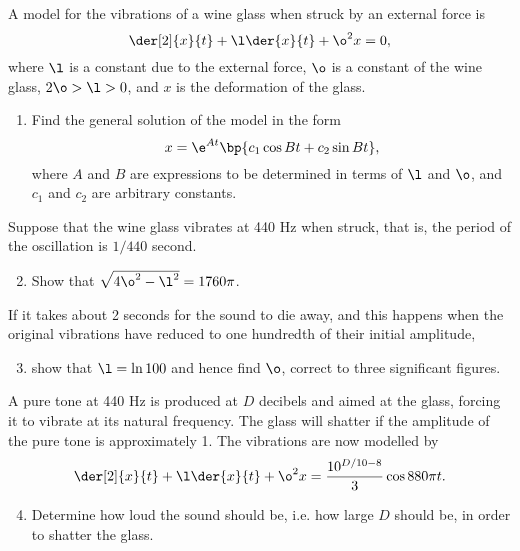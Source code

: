 \begin{problem}[\chili]
    A model for the vibrations of a wine glass when struck by an external force is \[\der[2]{x}{t} + \l \der{x}{t} + \o^2 x = 0,\] where $\l$ is a constant due to the external force, $\o$ is a constant of the wine glass, $2\o > \l > 0$, and $x$ is the deformation of the glass.

    \begin{enumerate}
        \item Find the general solution of the model in the form \[x = \e^{At} \bp{c_1 \cos Bt + c_2 \sin Bt},\] where $A$ and $B$ are expressions to be determined in terms of $\l$ and $\o$, and $c_1$ and $c_2$ are arbitrary constants.
    \end{enumerate}

    Suppose that the wine glass vibrates at 440 Hz when struck, that is, the period of the oscillation is $1/440$ second.

    \begin{enumerate}
        \setcounter{enumi}{1}
        \item Show that $\sqrt{4\o^2 - \l^2} = 1760 \pi$.
    \end{enumerate}

    If it takes about 2 seconds for the sound to die away, and this happens when the original vibrations have reduced to one hundredth of their initial amplitude,
    \begin{enumerate}
        \setcounter{enumi}{2}
        \item show that $\l = \ln 100$ and hence find $\o$, correct to three significant figures.
    \end{enumerate}

    A pure tone at 440 Hz is produced at $D$ decibels and aimed at the glass, forcing it to vibrate at its natural frequency. The glass will shatter if the amplitude of the pure tone is approximately 1. The vibrations are now modelled by \[\der[2]{x}{t} + \l \der{x}{t} + \o^2 x = \frac{10^{D/10 - 8}}{3} \cos{880\pi t}.\]

    \begin{enumerate}
        \setcounter{enumi}{3}
        \item Determine how loud the sound should be, i.e. how large $D$ should be, in order to shatter the glass.
    \end{enumerate}
\end{problem}